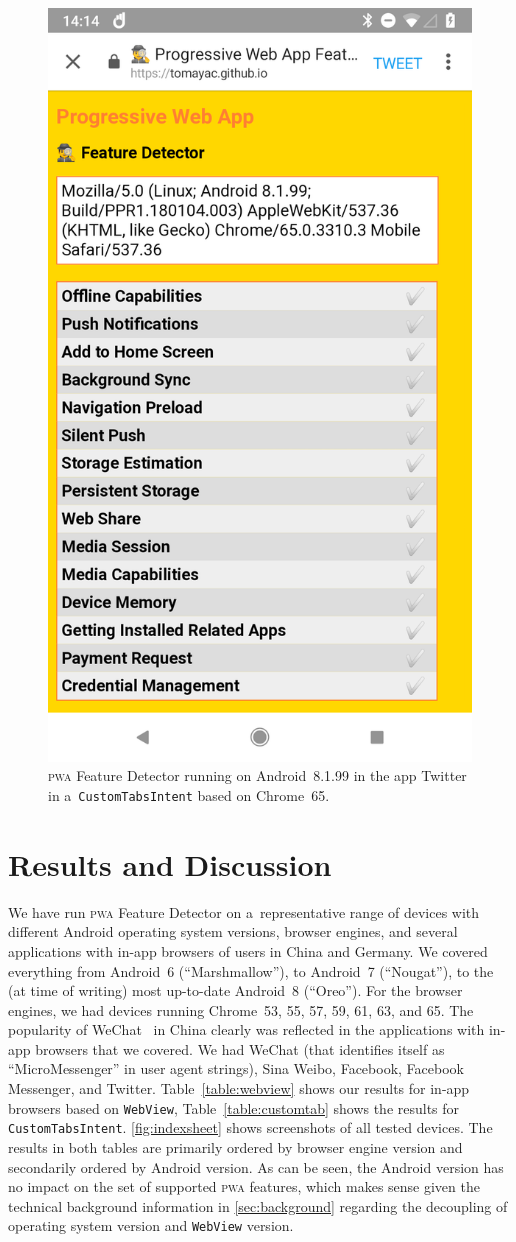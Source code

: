 \documentclass[sigconf]{acmart}
\begin{document}
\begin{figure}[t]
  \centering
  \includegraphics[width=.5\columnwidth,frame]{pwa-feature-detector-twitter-android-chrome65}
  \caption[\textsc{pwa} Feature Detector running in Twitter.]{
    \textsc{pwa} Feature Detector running on Android~8.1.99 in the app Twitter
    in a~\texttt{CustomTabsIntent} based on Chrome~65.}
  \label{fig:twitter-android-chrome65}
\end{figure}

\section{Results and Discussion}
\label{sec:results-and-discussion}

We have run \textsc{pwa} Feature Detector on a~representative range of devices
with different Android operating system versions, browser engines,
and several applications with in-app browsers of users in China and Germany.
We covered everything from Android~6 (``Marshmallow''),
to Android~7 (``Nougat''),
to the (at time of writing) most up-to-date Android~8 (``Oreo''). 
For the browser engines, we had devices running Chrome~53, 55, 57, 59, 61, 63, and 65.
The popularity of WeChat~\cite{chan2015wechat} in China clearly was reflected 
in the applications with in-app browsers that we covered.
We had WeChat (that identifies itself as ``MicroMessenger'' in user agent strings),
Sina Weibo, Facebook, Facebook Messenger, and Twitter.
Table~\ref{table:webview} shows our results for in-app browsers based on
\texttt{WebView}, Table~\ref{table:customtab} shows the results for
\texttt{CustomTabsIntent}.
\autoref{fig:indexsheet} shows screenshots of all tested devices.
The results in both tables are primarily ordered by browser engine version
and secondarily ordered by Android version.
As can be seen, the Android version has no impact
on the set of supported \textsc{pwa} features,
which makes sense given the technical background information
in \autoref{sec:background} regarding the decoupling of operating system version
and \texttt{WebView} version.
\end{document}
